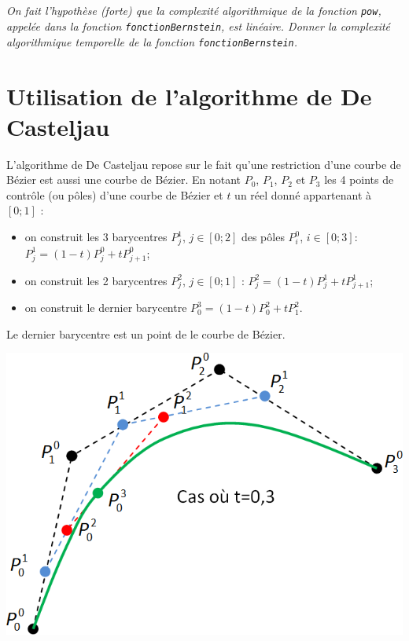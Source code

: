 \documentclass[10pt,fleqn]{article} %
\begin{document}
\subparagraph{}
\textit{On fait l'hypothèse (forte) que la complexité algorithmique de la fonction \texttt{pow}, appelée dans la fonction \texttt{fonctionBernstein}, est linéaire. Donner la complexité algorithmique temporelle de la fonction \texttt{fonctionBernstein}.}


\section{Utilisation de l'algorithme de De Casteljau}


\begin{minipage}[c]{0.6\linewidth}
L'algorithme de De Casteljau repose sur le fait qu'une restriction d'une courbe de Bézier est aussi une courbe de Bézier. En notant $P_0$, $P_1$, $P_2$ et $P_3$ les 4 points de contrôle (ou pôles) d'une courbe de Bézier et $t$ un réel donné appartenant à $[0;1]$ : 
\begin{itemize}[label=,font=\color{ocre}] 
\item on construit les 3 barycentres $P_j^1$, $j \in [0;2]$ des pôles $P_i^0$, $i\in[0;3]$: $P_j^1 = \left(1-t\right)P_j^0 + tP_{j+1}^{0}$;
\item on construit les 2 barycentres $P_j^2$, $j \in [0;1]$ : $P_j^2 = \left(1-t\right)P_j^1 + tP_{j+1}^{1}$;
\item on construit le dernier barycentre  $P_0^3 = \left(1-t\right)P_0^2 + tP_{1}^{2}$.
\end{itemize}
Le dernier barycentre est un point de le courbe de Bézier. 
\end{minipage} \hfill
\begin{minipage}[c]{0.37\linewidth}
\begin{center}
\includegraphics[width=.9\linewidth]{images/casteljau}
\end{center}
\end{minipage}
\end{document}
